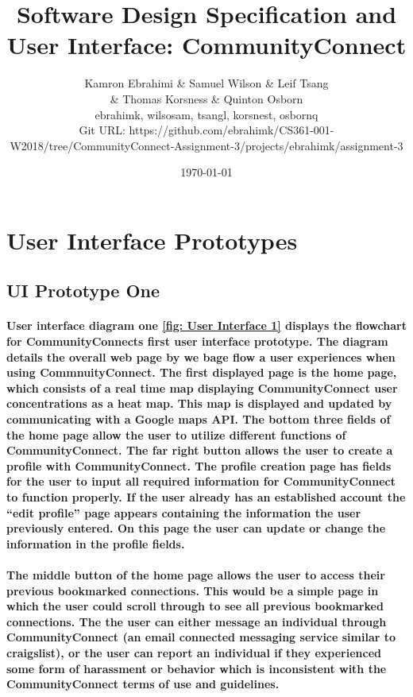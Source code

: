 \documentclass[12pt]{article}
\title{Software Design Specification and User Interface: CommunityConnect}
\author{Kamron Ebrahimi \& Samuel Wilson \& Leif Tsang \\ \& Thomas Korsness  \& Quinton Osborn \\ ebrahimk, wilsosam, tsangl, korsnest, osbornq \\ \scriptsize{Git URL: https://github.com/ebrahimk/CS361-001-W2018/tree/CommunityConnect-Assignment-3/projects/ebrahimk/assignment-3}}
\date{\today}
\begin{document}
\maketitle

\tableofcontents

\newpage
\section{\bf User Interface Prototypes}
  \subsection{\bf UI Prototype One}

  \paragraph{\normalfont \indent User interface diagram one \ref{fig: User Interface 1} displays the flowchart for CommunityConnects first user interface prototype. The diagram details the overall web page by we bage flow a user experiences when using CommnuityConnect. The first displayed page is the home page, which consists of a real time map displaying CommunityConnect user concentrations as a heat map. This map is displayed and updated by communicating with a Google maps API. The bottom three fields of the home page allow the user to utilize different functions of CommunityConnect. The far right button allows the user to create a profile with CommunityConnect. The profile creation page has fields for the user to input all required information for CommunityConnect to function properly. If the user already has an established account the “edit profile” page appears containing the information the user previously entered. On this page the user can update or change the information in the profile fields.
  }
  \paragraph{\normalfont \indent The middle button of the home page allows the user to access their previous bookmarked connections. This would be a simple page in which the user could scroll through to see all previous bookmarked connections. The the user can either message an individual through CommunityConnect (an email connected messaging service similar to craigslist), or the user can report an individual if they experienced some form of harassment or behavior which is inconsistent with the CommunityConnect terms of use and guidelines.
  }
\end{document}
